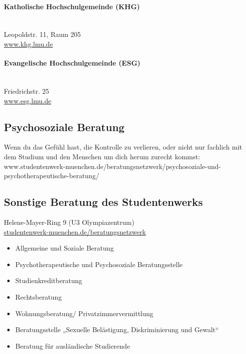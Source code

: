 \paragraph{Katholische Hochschulgemeinde (KHG)}\hfill\\
Leopoldstr. 11, Raum 205\\
\url{www.khg.lmu.de}

\paragraph{Evangelische Hochschulgemeinde (ESG)}\hfill\\
Friedrichstr. 25\\
\url{www.esg.lmu.de}



\subsection{Psychosoziale Beratung}

Wenn du das Gefühl hast, die Kontrolle zu verlieren, oder nicht nur fachlich mit
dem Studium und den Menschen um dich herum zurecht kommst:\\
www.studentenwerk-muenchen.de/beratungsnetzwerk/psychosoziale-und\newline -psychotherapeutische-beratung/


\subsection{Sonstige Beratung des Studentenwerks}
Helene-Mayer-Ring 9 (U3 Olympiazentrum)\\
\url{studentenwerk-muenchen.de/beratungsnetzwerk}

\begin{itemize}
	\item Allgemeine und Soziale Beratung
	\item Psychotherapeutische und Psychosoziale Beratungsstelle
	\item Studienkreditberatung
	\item Rechtsberatung
	\item Wohnungsberatung/ Privatzimmervermittlung
	\item Beratungsstelle „Sexuelle Belästigung, Diskriminierung und Gewalt“
	\item Beratung für ausländische Studierende
\end{itemize}

